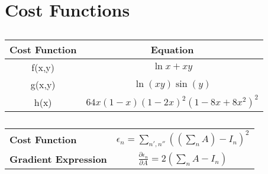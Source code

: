 \section{Cost Functions}

\begin{table}[h]
    \centering
    \caption{}
    \label{tab:cost_functions}
    \begin{tabular}{ c c }
        \hline
        \textbf{Cost Function} & \textbf{Equation}                \\
        \hline
        f(x,y)                 & $\ln{x} + xy$                    \\
        g(x,y)                 & $\ln(xy)\sin(y)$                 \\
        h(x)                   & $64x(1-x) (1-2x)^2(1-8x+8x^2)^2$ \\
    \end{tabular}
\end{table}


\begin{table}[h]
    \centering
    \caption{}
    \label{tab:integer_model}
    \begin{tabular}{ l c }
        \hline
        \textbf{Cost Function}       & $\epsilon_{n} = \sum_{n', n''} ( (\sum_{n} A) - I_{n})^2 $           \\
        \textbf{Gradient Expression} & $\frac{\partial \epsilon_{n}}{\partial A} = 2 (\sum_{n} A - I_{n}) $ \\
        \hline
    \end{tabular}
\end{table}
